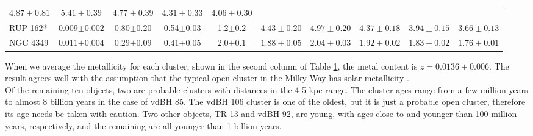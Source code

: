\documentclass[draft]{aa}
\begin{document}
\begin{table}[ht]
\begin{tabular}{lccccccccc}
 $4.87\pm0.81$ & $5.41\pm0.39$ & $4.77\pm0.39$ & $4.31\pm0.33$ & $4.06\pm0.30$\\
 RUP 162* & 0.009$\pm0.002$ & 0.80$\pm0.20$ & 0.54$\pm0.03$ & 1.2$\pm0.2$ &
 $4.43\pm0.20$ & $4.97\pm0.20$ & $4.37\pm0.18$ & $3.94\pm0.15$ & $3.66\pm0.13$\\
 NGC 4349 & 0.011$\pm0.004$ & 0.29$\pm0.09$ & 0.41$\pm0.05$ & 2.0$\pm0.1$ &
 $1.88\pm0.05$ & $2.04\pm0.03$ & $1.92\pm0.02$ & $1.83\pm0.02$ & $1.76\pm0.01$\\
\hline
\end{tabular}
\label{tab:final_tab}
\end{table}

When we average the metallicity for each cluster, shown in the second
column of Table \ref{tab:final_tab}, the metal content is $z=0.0136\pm0.006$.
The result agrees well with the assumption that the typical  open cluster in the Milky Way has solar metallicity \citep[$z=0.0152$,][]{Bressan_2012}.\\

Of the remaining ten objects, two are probable clusters with distances in the
4-5 kpc range. The cluster ages range from a few million years
to almost 8 billion years in the case of vdBH 85. The vdBH 106 cluster
is one of the oldest, but it is just a probable open cluster, therefore its age needs
be taken with caution. Two other objects, TR 13 and vdBH 92, are young, with
ages close to and younger than 100 million years, respectively, and the remaining are all
younger than 1 billion years.
\end{document}
